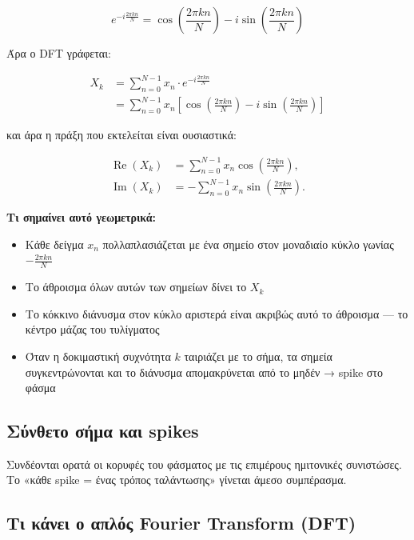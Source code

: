 \documentclass[
  a4paper,
  11pt,
]{article}
\providecommand{\tightlist}{%
  \setlength{\itemsep}{0pt}\setlength{\parskip}{0pt}}
\begin{document}
\[e^{-i\frac{2\pi kn}{N}} = \cos\!\left(\frac{2\pi kn}{N}\right) - i\sin\!\left(\frac{2\pi kn}{N}\right)\]

Άρα ο DFT γράφεται:

\[\begin{split}
X_k &= \sum_{n=0}^{N-1} x_n \cdot e^{-i\frac{2\pi kn}{N}} \\[6pt]
    &= \sum_{n=0}^{N-1} x_n \left[\cos\!\left(\frac{2\pi kn}{N}\right)
       - i\sin\!\left(\frac{2\pi kn}{N}\right)\right]
\end{split}\]

και άρα η πράξη που εκτελείται είναι ουσιαστικά:

\[\begin{split}
\operatorname{Re}(X_k) &= \sum_{n=0}^{N-1} x_n\cos\!\left(\frac{2\pi kn}{N}\right), \\
\operatorname{Im}(X_k) &= -\sum_{n=0}^{N-1} x_n\sin\!\left(\frac{2\pi kn}{N}\right).
\end{split}\]

\textbf{Τι σημαίνει αυτό γεωμετρικά:}

\begin{itemize}
\tightlist
\item
  Κάθε δείγμα \(x_n\) πολλαπλασιάζεται με ένα σημείο στον μοναδιαίο
  κύκλο γωνίας \(-\frac{2\pi kn}{N}\)
\item
  Το άθροισμα όλων αυτών των σημείων δίνει το \(X_k\)
\item
  Το κόκκινο διάνυσμα στον κύκλο αριστερά είναι ακριβώς αυτό το άθροισμα
  --- το κέντρο μάζας του τυλίγματος
\item
  Όταν η δοκιμαστική συχνότητα \(k\) ταιριάζει με το σήμα, τα σημεία
  συγκεντρώνονται και το διάνυσμα απομακρύνεται από το μηδέν → spike στο
  φάσμα
\end{itemize}

\subsection{Σύνθετο σήμα και
spikes}\label{ux3c3ux3cdux3bdux3b8ux3b5ux3c4ux3bf-ux3c3ux3aeux3bcux3b1-ux3baux3b1ux3b9-spikes}

Συνδέονται ορατά οι κορυφές του φάσματος με τις επιμέρους ημιτονικές
συνιστώσες. Το «κάθε spike = ένας τρόπος ταλάντωσης» γίνεται άμεσο
συμπέρασμα.

\subsection{Τι κάνει ο απλός Fourier Transform
(DFT)}\label{ux3c4ux3b9-ux3baux3acux3bdux3b5ux3b9-ux3bf-ux3b1ux3c0ux3bbux3ccux3c2-fourier-transform-dft}
\end{document}
